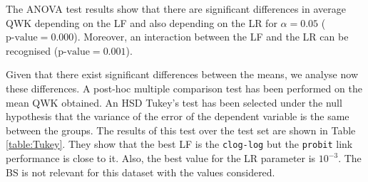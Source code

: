 \documentclass[journal]{IEEEtran}
\begin{document}
	The ANOVA test results show that there are significant differences in average QWK depending on the LF and also depending on the LR for $\alpha=0.05$ ($\text{p-value} = 0.000$). Moreover, an interaction between the LF and the LR can be recognised ($\text{p-value} = 0.001$).
		
	
	Given that there exist significant differences between the means, we analyse now these differences. A post-hoc multiple comparison test has been performed on the mean QWK obtained. An HSD Tukey's test \cite{tukey1949comparing} has been selected under the null hypothesis that the variance of the error of the dependent variable is the same between the groups. The results of this test over the test set are shown in Table \ref{table:Tukey}. They show that the best LF is the \texttt{clog-log} but the \texttt{probit} link performance is close to it. Also, the best value for the LR parameter is $10^{-3}$. The BS is not relevant for this dataset with the values considered.
	
\end{document}
